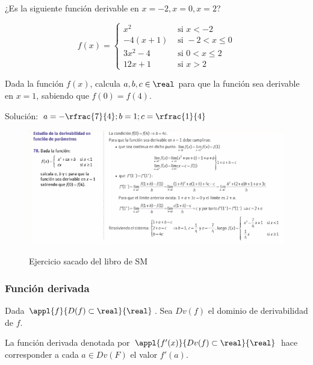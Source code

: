 \begin{problem}[Página 43, 14.]
¿Es la siguiente función derivable en $x=-2,x=0,x=2$?

\[f(x) = \begin{cases}
x^2 & \text{ si } x<-2\\
-4(x+1) & \text{ si } -2<x\leq0\\
3x^2-4 & \text{ si } 0<x\leq2\\
12x+1 & \text{ si } x>2
\end{cases}\]
\solution
\end{problem}

\begin{problem}
Dada la función $f(x)$, calcula $a,b,c\in\real$ para que la función sea derivable en $x=1$, sabiendo que $f(0) = f(4)$.
\solution

Solución: $a=-\rfrac{7}{4}; b=1; c=\rfrac{1}{4}$

\begin{figure}[h!]
\centering
\includegraphics[scale=1.1]{img/DerivabilidadEjer5678}
\label{ejercicioDerivabilidad}
\caption{Ejercicio sacado del libro de SM}
\end{figure}

\end{problem}


\subsubsection{Función derivada}

\begin{defn}
Dada $\appl{f}{D(f)\subset\real}{\real}$. Sea $Dv(f)$ el dominio de derivabilidad de $f$.

La función derivada denotada por $\appl{f'(x)}{Dv(f)\subset\real}{\real}$ hace corresponder a cada $a\in Dv(F)$ el valor $f'(a)$.
\end{defn}


